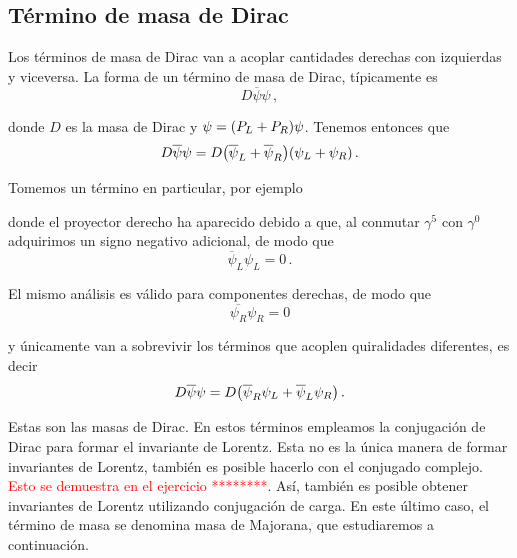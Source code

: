 \subsection{Término de masa de Dirac}

Los términos de masa de Dirac van a acoplar cantidades derechas con izquierdas y viceversa. La forma de un término de masa de Dirac, típicamente es
%
\begin{equation}
	D\overline{\psi}\psi\,,
\end{equation}

\noindent donde $D$ es la masa de Dirac y $\psi = \qty(P_L + P_R)\psi$. Tenemos entonces que
%
\begin{equation}
	D \overline{\psi}\psi = D \qty(\overline{\psi}_L + \overline{\psi}_R) \qty(\psi_L + \psi_R) \,.
\end{equation}

Tomemos un término en particular, por ejemplo
%

\noindent donde el proyector derecho ha aparecido debido a que, al conmutar $\gamma^5$ con $\gamma^0$ adquirimos un signo negativo adicional, de modo que
%
\begin{equation}
	\overline{\psi}_L \psi_L = 0 \,.
\end{equation}

El mismo análisis es válido para componentes derechas, de modo que
%
\begin{equation}
	\overline{\psi_R}\psi_R = 0
\end{equation}

\noindent y únicamente van a sobrevivir los términos que acoplen quiralidades diferentes, es decir
%
\begin{equation}
	D\overline{\psi}\psi = D\qty(\overline{\psi}_R\psi_L + \overline{\psi}_L \psi_R) \,.
\end{equation}

Estas son las masas de Dirac. En estos términos empleamos la conjugación de Dirac para formar el invariante de Lorentz. Esta no es la única manera de formar invariantes de Lorentz, también es posible hacerlo con el conjugado complejo. \textcolor{red}{Esto se demuestra en el ejercicio ********}. Así, también es posible obtener invariantes de Lorentz utilizando conjugación de carga. En este último caso, el término de masa se denomina masa de Majorana, que estudiaremos a continuación.




